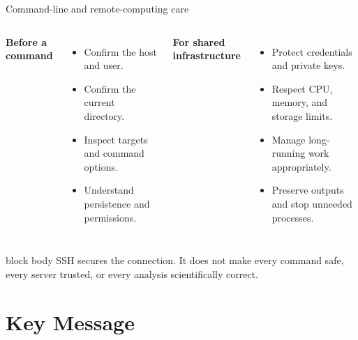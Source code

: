 \documentclass[10pt,aspectratio=169]{beamer}
\begin{document}
\begin{frame}{Command-line and remote-computing care}

\small

\begin{columns}[T]


\textbf{Before a command}

\begin{itemize}
  \item Confirm the host and user.
  \item Confirm the current directory.
  \item Inspect targets and command options.
  \item Understand persistence and permissions.
\end{itemize}


\textbf{For shared infrastructure}

\begin{itemize}
  \item Protect credentials and private keys.
  \item Respect CPU, memory, and storage limits.
  \item Manage long-running work appropriately.
  \item Preserve outputs and stop unneeded processes.
\end{itemize}

\end{columns}

\vspace{0.25cm}

\begin{beamercolorbox}[rounded=true,sep=8pt]{block body}
SSH secures the connection. It does not make every command safe, every server trusted, or every analysis scientifically correct.
\end{beamercolorbox}

\end{frame}


\section{Key Message}
\end{document}
